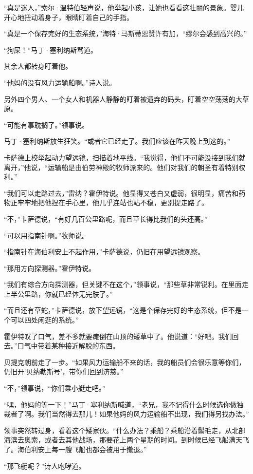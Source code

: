 \documentclass[AutoFakeBold=true]{book}
\begin{document}
``真是迷人，''索尔·温特伯轻声说，他举起小孩，让她也看看这壮丽的景象。婴儿开心地扭动着身子，眼睛盯着自己的手指。

``真是一个保存完好的生态系统，''海特·马斯蒂恩赞许有加，``缪尔会感到高兴的。''

``狗屎！''马丁·塞利纳斯骂道。

其余人都转身盯着他。

``他妈的没有风力运输船啊。''诗人说。

另外四个男人、一个女人和机器人静静的盯着被遗弃的码头，盯着空空荡荡的大草原。

``可能有事耽搁了。''领事说。

马丁·塞利纳斯放生狂笑。``或者它已经走了。我们应该在昨天晚上到这的。''

卡萨德上校举起动力望远镜，扫描着地平线。``我觉得，他们不可能没接到我们就离开，''他说，``运输船是由伯劳神殿的牧师派来的。他们对我们的朝圣有着特别权利。''

``我们可以走路过去，''雷纳？霍伊特说。他显得又苍白又虚弱，很明显，痛苦和药物正牢牢地把他捏在手心里，他几乎连站也站不稳，更别提走路了。

``不，''卡萨德说，``有好几百公里路呢，而且草长得比我们的头还高。''

``可以用指南针啊。''牧师说。

``指南针在海伯利安上不起作用，''卡萨德说，仍旧在用望远镜观察。

``那用方向探测器。''霍伊特说。

``我们有综合方向探测器，但关键不在这个，''领事说，``那些草非常锐利。在里面走上半公里路，你就已经体无完肤了。''

``而且还有草蛇，''卡萨德说，放下望远镜，``这是个保存完好的生态系统，但不是一个可以四处闲逛的系统。''

霍伊特叹了口气，差不多就要瘫倒在山顶的矮草中了。他说道：``好吧。我们回去。''口气中带着某种接近解脱的东西。

贝提克朝前走了一步。``如果风力运输船不来的话，我的船员们会很乐意等你们，仍旧开`贝纳勒斯号'，带你们回到济慈。''

``不，''领事说，``你们乘小艇走吧。''

``嘿，他妈的等一下！''马丁·塞利纳斯喊道，``老兄，我不记得什么时候选你做独裁者了啊。我们当然得去那儿！如果他妈的风力运输船不出现，我们得另找办法。''

领事突然转过身，看着这个矮家伙。``什么办法？乘船？乘船沿着鬃毛走，从北部海滨去奥索，或者去其他战场，那要花上两个星期的时间。到时候已经飞船满天飞了。海伯利安上每一艘飞船也都会被用于撤退。''

``那飞艇呢？''诗人咆哮道。
\end{document}
